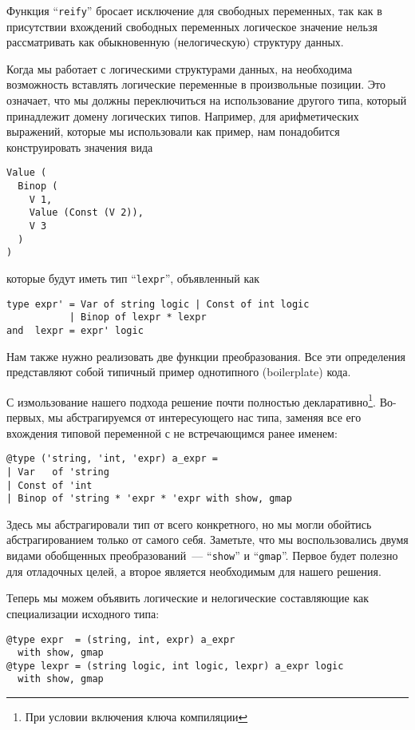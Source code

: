 Функция ``\lstinline{reify}'' бросает исключение для свободных переменных, так как в присутствии вхождений свободных переменных
логическое значение нельзя рассматривать как обыкновенную (нелогическую) структуру данных.

Когда мы работает с логическими структурами данных, на необходима возможность вставлять логические переменные в произвольные позиции.
Это означает, что мы должны переключиться на использование другого типа, который принадлежит домену логических типов. Например,
для арифметических выражений, которые мы использовали как пример, нам понадобится конструировать значения вида

\begin{lstlisting}
Value (
  Binop (
    V 1, 
    Value (Const (V 2)),
    V 3
  )
)
\end{lstlisting}
которые будут иметь тип ``\lstinline{lexpr}'', объявленный как

\begin{lstlisting}
type expr' = Var of string logic | Const of int logic 
           | Binop of lexpr * lexpr
and  lexpr = expr' logic
\end{lstlisting}

Нам также нужно реализовать две функции преобразования. Все эти определения представляют собой типичный пример однотипного (boilerplate) кода.

С измользование нашего подхода решение почти полностью декларативно\footnote{При условии включения ключа компиляции }.
Во-первых, мы абстрагируемся от интересующего нас типа, заменяя все его вхождения типовой переменной с не встречающимся ранее именем:

\begin{lstlisting}
@type ('string, 'int, 'expr) a_expr =
| Var   of 'string
| Const of 'int
| Binop of 'string * 'expr * 'expr with show, gmap
\end{lstlisting}

Здесь мы абстрагировали тип от всего конкретного, но мы могли обойтись абстрагированием только от самого себя. Заметьте, что 
мы воспользовались двумя видами обобщенных преобразований~--- ``\lstinline{show}'' и ``\lstinline{gmap}''. 
Первое будет полезно для отладочных целей, а второе является необходимым для нашего решения.

Теперь мы можем объявить логические и нелогические составляющие как специализации исходного типа:

\begin{lstlisting}
@type expr  = (string, int, expr) a_expr 
  with show, gmap
@type lexpr = (string logic, int logic, lexpr) a_expr logic 
  with show, gmap
\end{lstlisting}

